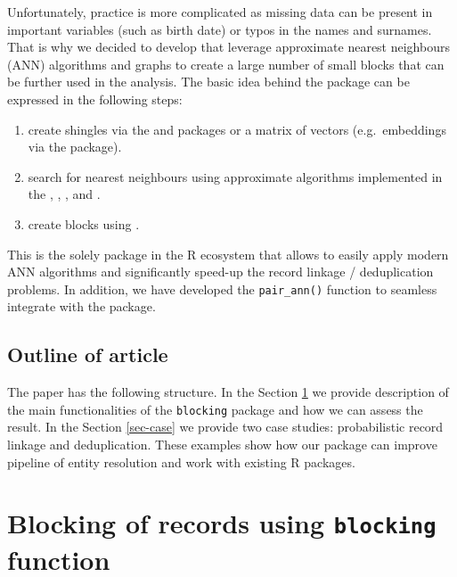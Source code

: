Unfortunately, practice is more complicated as missing data can be present in important variables (such as birth date) or typos in the names and surnames. That is why we decided to develop  that leverage approximate nearest neighbours (ANN) algorithms and graphs to create a large number of small blocks that can be further used in the analysis. The basic idea behind the package can be expressed in the following steps:

\begin{enumerate}
\def\labelenumi{\arabic{enumi}.}
\tightlist
\item
  create shingles via the  \citep{tokenizers} and  \citep{text2vec} packages or a matrix of vectors (e.g.~embeddings via the  \citep{ragnar} package).
\item
  search for nearest neighbours using approximate algorithms implemented in the  \citep{rnndescent},  \citep{RcppHNSW},  \citep[\citet{mlpack2025}]{mlpack2023}, and  \citep{RcppAnnoy}.
\item
  create blocks using  \citep[\citet{igraph2006}]{igraph2025}.
\end{enumerate}

This is the solely package in the R ecosystem that allows to easily apply modern ANN algorithms and significantly speed-up the record linkage / deduplication problems. In addition, we have developed the \texttt{pair\_ann()} function to seamless integrate with the  package.

\subsection{Outline of article}\label{outline-of-article}

The paper has the following structure. In the Section \ref{sec-blocks} we provide description of the main functionalities of the \texttt{blocking} package and how we can assess the result. In the Section \ref{sec-case} we provide two case studies: probabilistic record linkage and deduplication. These examples show how our package can improve pipeline of entity resolution and work with existing R packages.

\section{\texorpdfstring{Blocking of records using \texttt{blocking} function}{Blocking of records using blocking function}}\label{sec-blocks}

